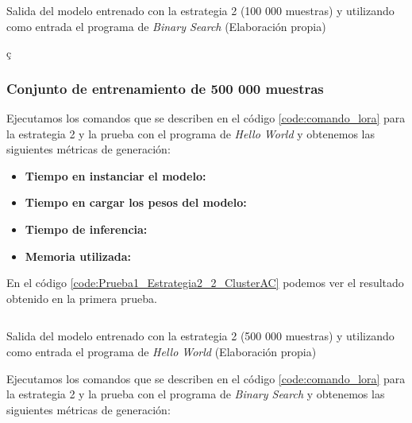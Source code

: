 \begin{mycode}
    \begin{verbatim}

    \end{verbatim}
    \caption[Salida del modelo entrenado con la estrategia 2 (100 000 muestras) y utilizando como entrada el programa de \textit{Binary Search}]{Salida del modelo entrenado con la estrategia 2 (100 000 muestras) y utilizando como entrada el programa de \textit{Binary Search} (Elaboración propia)}
    \label{code:Prueba2_Estrategia2_1_ClusterAC}
\end{mycode}ç

\subsubsection{Conjunto de entrenamiento de 500 000 muestras}

Ejecutamos los comandos que se describen en el código \ref{code:comando_lora} para
la estrategia 2 y la prueba con el programa de \textit{Hello World} y obtenemos
las siguientes métricas de generación:

\begin{itemize}
    \item \textbf{Tiempo en instanciar el modelo:}
    \item \textbf{Tiempo en cargar los pesos del modelo:}
    \item \textbf{Tiempo de inferencia:}
    \item \textbf{Memoria utilizada:}
\end{itemize}

En el código \ref{code:Prueba1_Estrategia2_2_ClusterAC} podemos ver el resultado obtenido
en la primera prueba.

\begin{mycode}
    \begin{verbatim}

    \end{verbatim}
    \caption[Salida del modelo entrenado con la estrategia 2 (500 000 muestras) y utilizando como entrada el programa de \textit{Hello World}]{Salida del modelo entrenado con la estrategia 2 (500 000 muestras) y utilizando como entrada el programa de \textit{Hello World} (Elaboración propia)}
    \label{code:Prueba1_Estrategia2_2_ClusterAC}
\end{mycode}

Ejecutamos los comandos que se describen en el código \ref{code:comando_lora} para
la estrategia 2 y la prueba con el programa de \textit{Binary Search} y obtenemos
las siguientes métricas de generación:

